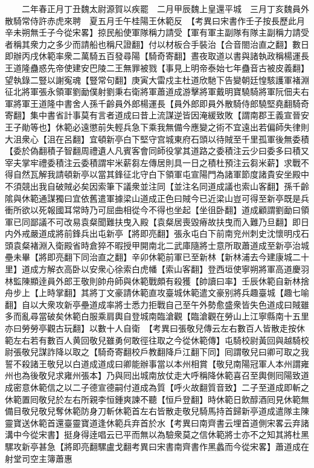 　　二年春正月丁丑魏太尉源賀以疾罷　二月甲辰魏上皇還平城　三月丁亥魏員外散騎常侍許赤虎來聘　夏五月壬午桂陽王休範反　【考異曰宋書作壬子按長歷此月辛未朔無壬子今從宋畧】掠民船使軍隊稱力請受【軍有軍主副隊有隊主副稱力請受者稱其衆力之多少而請船也稱尺證翻】付以材板合手裝治【合音閤治直之翻】數日即辦丙戌休範率衆二萬騎五百發尋陽【騎奇寄翻】晝夜取道以書與諸執政稱楊運長王道隆蠱惑先帝使建安巴陵二王無罪被戮【事見上明帝泰始七年蠱音古被皮義翻】望執錄二豎以謝寃魂【豎常句翻】庚寅大雷戍主杜道欣馳下告變朝廷惶駭護軍褚淵征北將軍張永領軍劉勔僕射劉秉右衛將軍蕭道成游擊將軍戴明寶驍騎將軍阮佃夫右軍將軍王道隆中書舍人孫千齡員外郎楊運長【員外郎即員外散騎侍郎驍堅堯翻騎奇寄翻】集中書省計事莫有言者道成曰昔上流謀逆皆因淹緩致敗【謂南郡王義宣晉安王子勛等也】休範必遠懲前失輕兵急下乘我無備今應變之術不宜遠出若偏師失律則大沮衆心【沮在呂翻】宜頓新亭白下堅守宫城東府石頭以待賊至千里孤軍後無委積【委於偽翻積子智翻周禮遺人凡賓客會同師役掌其道路之委積注云少曰委多曰積又宰夫掌牢禮委積注云委積謂牢米薪芻左傳居則具一日之積杜預注云芻米薪】求戰不得自然瓦解我請頓新亭以當其鋒征北守白下領軍屯宣陽門為諸軍節度諸貴安坐殿中不須競出我自破賊必矣因索筆下議衆並注同【並注名同道成議也索山客翻】孫千齡隂與休範通謀獨曰宜依舊遣軍據梁山道成正色曰賊今已近梁山豈可得至新亭既是兵衝所欲以死報國耳常時乃可屈曲相從今不得也坐起【坐徂卧翻】道成顧謂劉勔曰領軍已同鄙議不可改易袁粲聞難扶曳入殿【袁粲居喪毀瘠故扶曳而入難乃旦翻】即日内外戒嚴道成將前鋒兵出屯新亭【將即亮翻】張永屯白下前南兖州刺史沈懷明戍石頭袁粲褚淵入衛殿省時倉猝不暇授甲開南北二武庫隨將士意所取蕭道成至新亭治城壘未畢【將即亮翻下同治直之翻】辛卯休範前軍已至新林【新林浦去今建康城二十里】道成方解衣高卧以安衆心徐索白虎幡【索山客翻】登西垣使寧朔將軍高道慶羽林監陳顯逹員外郎王敬則帥舟師與休範戰頗有殺獲【帥讀曰率】壬辰休範自新林捨舟步上【上時掌翻】其將丁文豪請休範直攻臺城休範遣文豪别將兵趣臺城【趣七喻翻】自以大衆攻新亭壘道成率將士悉力拒戰自己至午外勢愈盛衆皆失色道成曰賊雖多而亂尋當破矣休範白服乘肩輿自登城南臨滄觀【臨滄觀在勞山上江寧縣南十五里亦曰勞勞亭觀古玩翻】以數十人自衛　【考異曰張敬兒傳云左右數百人皆散走按休範左右若有數百人黄回敬兒雖勇何敢徑往取之今從休範傳】屯騎校尉黃回與越騎校尉張敬兒謀詐降以取之【騎奇寄翻校戶教翻降戶江翻下同】囘謂敬兒曰卿可取之我誓不殺諸王敬兒以白道成道成曰卿能辦事當以本州相賞【敬兒南陽冠軍人本州謂雍州也為後敬兒求雍州張本】乃與囘出城南放仗走大呼稱降休範喜召至輿側囘陽致道成密意休範信之以二子德宣德嗣付道成為質【呼火故翻質音致】二子至道成即斬之休範置囘敬兒於左右所親李恒鍾爽諫不聽【恒戶登翻】時休範日飲醇酒囘見休範無備目敬兒敬兒奪休範防身刀斬休範首左右皆散走敬兒騎馬持首歸新亭道成遣隊主陳靈寶送休範首還臺靈寶道逢休範兵弃首於水【考異曰南齊書云埋首道側宋畧云弃諸溝中今從宋書】挺身得逹唱云已平而無以為驗衆莫之信休範將士亦不之知其將杜黑騾攻新亭甚急【將即亮翻騾盧戈翻考異曰宋書南齊書作黑蠡而今從宋畧】蕭道成在射堂司空主簿蕭惠

